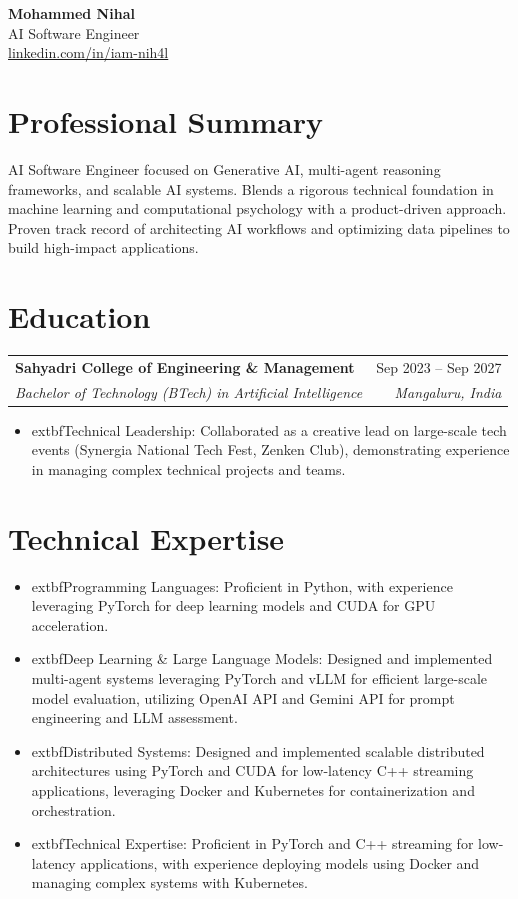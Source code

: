 \documentclass[letterpaper,10pt]{article}
\makeatletter
\newcommand{\heading}[3]{
  \begin{center}
    {\Huge \textbf{#1}} \\ \vspace{4pt}
    {#2} \\ \vspace{2pt}
    \href{https://#3}{#3}
  \end{center}
}
\newcommand{\resumeSubheading}[4]{
  \vspace{2pt}\noindent
    \begin{tabular*}{0.97\textwidth}[t]{l@{\extracolsep{\fill}}r}
      \textbf{#1} & #2 \\
      \textit{\small#3} & \textit{\small #4} \\
    \end{tabular*}\vspace{-5pt}
}
\newcommand{\resumeItemListStart}{\begin{itemize}[leftmargin=0.15in, label={--}]}
\newcommand{\resumeItemListEnd}{\end{itemize}\vspace{-5pt}}
\newcommand{\resumeItem}[1]{\item\small{#1 \vspace{-2pt}}}
\makeatother
\begin{document}
\heading{Mohammed Nihal}{AI Software Engineer}{linkedin.com/in/iam-nih4l}

\section*{Professional Summary}
AI Software Engineer focused on Generative AI, multi-agent reasoning frameworks, and scalable AI systems. Blends a rigorous technical foundation in machine learning and computational psychology with a product-driven approach. Proven track record of architecting AI workflows and optimizing data pipelines to build high-impact applications.

\section*{Education}
\resumeSubheading
  {Sahyadri College of Engineering \& Management}{Sep 2023 -- Sep 2027}
  {Bachelor of Technology (BTech) in Artificial Intelligence}{Mangaluru, India}
\resumeItemListStart
  \resumeItem{extbf{Technical Leadership:} Collaborated as a creative lead on large-scale tech events (Synergia National Tech Fest, Zenken Club), demonstrating experience in managing complex technical projects and teams.}
\resumeItemListEnd

\section*{Technical Expertise}
\begin{itemize}[leftmargin=0.15in, label={}]
  \resumeItem{extbf{Programming Languages:} Proficient in Python, with experience leveraging PyTorch for deep learning models and CUDA for GPU acceleration.}
  \resumeItem{extbf{Deep Learning \& Large Language Models:} Designed and implemented multi-agent systems leveraging PyTorch and vLLM for efficient large-scale model evaluation, utilizing OpenAI API and Gemini API for prompt engineering and LLM assessment.}
  \resumeItem{extbf{Distributed Systems:} Designed and implemented scalable distributed architectures using PyTorch and CUDA for low-latency C++ streaming applications, leveraging Docker and Kubernetes for containerization and orchestration.}
  \resumeItem{extbf{Technical Expertise:} Proficient in PyTorch and C++ streaming for low-latency applications, with experience deploying models using Docker and managing complex systems with Kubernetes.}
\end{itemize}
\end{document}
